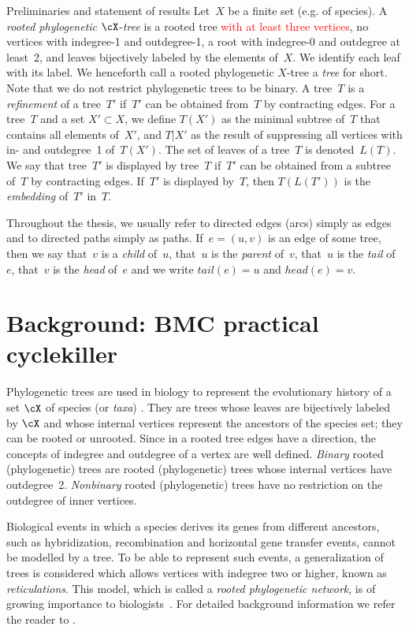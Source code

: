 {Preliminaries and statement of results}\label{sec:prelim}
Let~$X$ be a finite set (e.g. of species). A \emph{rooted phylogenetic} $\cX$-\emph{tree} is a rooted tree \textcolor{red}{with at least three vertices}, no vertices with indegree-1 and outdegree-1, a root with indegree-0 and outdegree at least~2, and leaves bijectively labeled by the elements of~$X$. We identify each leaf with its label. We henceforth call a rooted phylogenetic $X$-tree a \emph{tree} for short. Note that we do not restrict phylogenetic trees to be binary. A tree~$T$ is a \emph{refinement} of a tree~$T'$ if~$T'$ can be obtained from~$T$ by contracting edges. For a tree~$T$ and a set $X'\subset X$, we define $T(X')$ as the minimal subtree of~$T$ that contains all elements of~$X'$, and $T|X'$ as the result of suppressing all vertices with in- and outdegree~1 of~$T(X')$. The set of leaves of a tree~$T$ is denoted~$L(T)$. We say that tree~$T'$ is displayed by tree~$T$ if~$T'$ can be obtained from a subtree of~$T$ by contracting edges. If~$T'$ is displayed by~$T$, then $T(L(T'))$ is the \emph{
embedding} of~$T'$ in~$T$.

Throughout the thesis, we usually refer to directed edges (arcs) simply as edges and to directed paths simply as paths. If~$e=(u,v)$ is an edge of some tree, then we say that~$v$ is a \emph{child} of~$u$, that~$u$ is the \emph{parent} of~$v$, that~$u$ is the \emph{tail} of~$e$, that~$v$ is the \emph{head} of~$e$ and we write $tail(e)=u$ and $head(e)=v$.



\section{Background: BMC practical cyclekiller}

{Phylogenetic trees are} used in biology to represent the evolutionary history of a set ${\cX}$ of species (or \emph{taxa}) \cite{MathEvPhyl,reconstructingevolution}. They are trees whose leaves are bijectively labeled by ${\cX}$ and whose internal vertices represent the ancestors of the species set; they can be rooted or unrooted. Since in a rooted tree edges have a direction, the concepts of indegree and outdegree of a vertex are well defined. \emph{Binary} rooted (phylogenetic)  trees are rooted (phylogenetic) trees whose internal vertices have outdegree~2. \emph{Nonbinary} rooted (phylogenetic) trees have no restriction on the outdegree of inner vertices.

Biological events in which a species derives its genes from different ancestors, such as hybridization, recombination and horizontal gene transfer events, cannot be modelled by a tree. To be able to represent such events, a generalization of trees is considered which allows vertices with indegree two or higher, known as \emph{reticulations}. This model, which is called a \emph{{rooted} phylogenetic network}, is of growing importance to biologists~\cite{bapteste}. For detailed background information we refer the reader to \cite{HusonRuppScornavacca10,surveycombinatorial2011,Nakhleh2009ProbSolv}.

